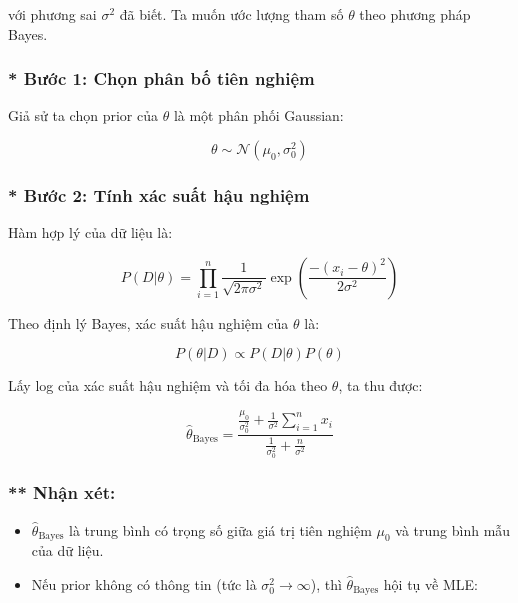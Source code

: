 với phương sai $\sigma^2$ đã biết. Ta muốn ước lượng tham số $\theta$ theo phương pháp Bayes.

\subsubsection*{* Bước 1: Chọn phân bố tiên nghiệm}
Giả sử ta chọn prior của $\theta$ là một phân phối Gaussian:

\begin{equation}
    \theta \sim \mathcal{N}(\mu_0, \sigma_0^2)
\end{equation}

\subsubsection*{* Bước 2: Tính xác suất hậu nghiệm}
Hàm hợp lý của dữ liệu là:

\begin{equation}
    P(D | \theta) = \prod_{i=1}^{n} \frac{1}{\sqrt{2\pi\sigma^2}} \exp \left( \frac{-(x_i - \theta)^2}{2\sigma^2} \right)
\end{equation}

\noindent Theo định lý Bayes, xác suất hậu nghiệm của $\theta$ là:

\begin{equation}
    P(\theta | D) \propto P(D | \theta) P(\theta)
\end{equation}

\noindent Lấy log của xác suất hậu nghiệm và tối đa hóa theo $\theta$, ta thu được:

\begin{equation}
    \hat{\theta}_{\text{Bayes}} = \frac{\frac{\mu_0}{\sigma_0^2} + \frac{1}{\sigma^2} \sum_{i=1}^{n} x_i}{\frac{1}{\sigma_0^2} + \frac{n}{\sigma^2}}
\end{equation}

\subsubsection*{** Nhận xét:}
\begin{itemize}
    \item $\hat{\theta}_{\text{Bayes}}$ là trung bình có trọng số giữa giá trị tiên nghiệm $\mu_0$ và trung bình mẫu của dữ liệu.
    \item Nếu prior không có thông tin (tức là $\sigma_0^2 \to \infty$), thì $\hat{\theta}_{\text{Bayes}}$ hội tụ về MLE:
\end{itemize}

